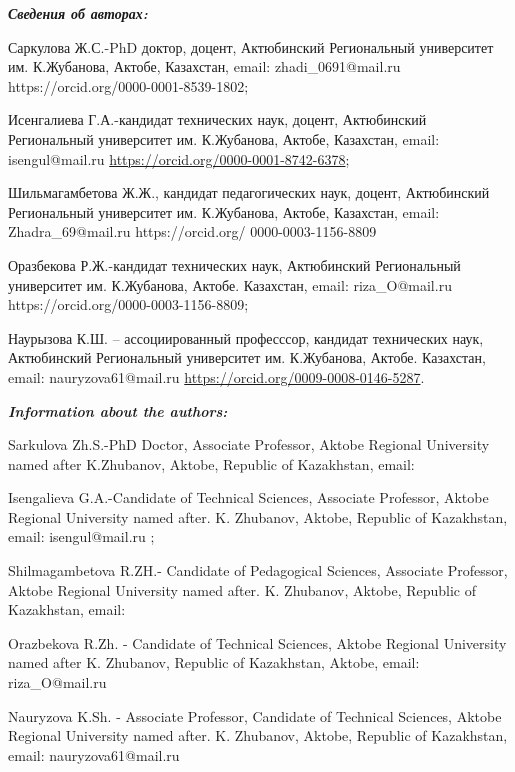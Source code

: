 \begin{authorinfo}
\emph{{\bfseries Сведения об авторах:}}

Саркулова Ж.С.-PhD доктор, доцент, Актюбинский Региональный университет
им. К.Жубанова, Актобе, Казахстан, email:
zhadi\_0691@mail.ru
https://orcid.org/0000-0001-8539-1802;

Исенгалиева Г.А.-кандидат технических наук, доцент, Актюбинский
Региональный университет им. К.Жубанова, Актобе, Казахстан, email:
isengul@mail.ru
\url{https://orcid.org/0000-0001-8742-6378};

Шильмагамбетова Ж.Ж., кандидат педагогических наук, доцент, Актюбинский
Региональный университет им. К.Жубанова, Актобе, Казахстан, email:
Zhadra\_69@mail.ru
https://orcid.org/ 0000-0003-1156-8809 

Оразбекова Р.Ж.-кандидат технических наук, Актюбинский Региональный
университет им. К.Жубанова, Актобе. Казахстан, email:
riza\_O@mail.ru
https://orcid.org/0000-0003-1156-8809;

Наурызова К.Ш. -- ассоциированный професссор, кандидат технических наук,
Актюбинский Региональный университет им. К.Жубанова, Актобе. Казахстан,
email: nauryzova61@mail.ru
\url{https://orcid.org/0009-0008-0146-5287}.

\emph{{\bfseries Information about the authors:}}

Sarkulova Zh.S.-PhD Doctor, Associate Professor, Aktobe Regional
University named after K.Zhubanov, Aktobe, Republic of Kazakhstan,
email:

Isengalieva G.A.-Candidate of Technical Sciences, Associate Professor,
Aktobe Regional University named after. K. Zhubanov, Aktobe, Republic of
Kazakhstan, email: isengul@mail.ru
\href{https://orcid.org/0000-0001-8742-6378}{};

Shilmagambetova R.ZH.- Candidate of Pedagogical Sciences, Associate
Professor, Aktobe Regional University named after. K. Zhubanov, Aktobe,
Republic of Kazakhstan, email:

Orazbekova R.Zh. - Candidate of Technical Sciences, Aktobe Regional
University named after K. Zhubanov, Republic of Kazakhstan, Aktobe,
email: riza\_O@mail.ru

Nauryzova K.Sh. - Associate Professor, Candidate of Technical Sciences,
Aktobe Regional University named after. K. Zhubanov, Aktobe, Republic of
Kazakhstan, email:
nauryzova61@mail.ru
\href{https://orcid.org/0009-0008-0146-5287}{}
\end{authorinfo}
